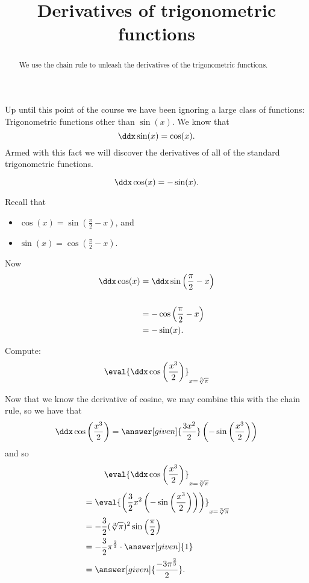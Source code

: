 \documentclass{ximera}
\title[Dig-In:]{Derivatives of trigonometric functions}
\begin{document}
\begin{abstract}
  We use the chain rule to unleash the derivatives of the
  trigonometric functions.
\end{abstract}
\maketitle


Up until this point of the course we have been ignoring a large class
of functions: Trigonometric functions other than $\sin(x)$. We know
that
\[
\ddx \sin(x) = \cos(x).
\]
Armed with this fact we will discover the derivatives of all of the
standard trigonometric functions.



\begin{theorem}
\[
\ddx \cos(x) = -\sin(x).
\]
\begin{explanation}
Recall that
\begin{itemize}
\item $\cos(x) = \sin\left(\frac{\pi}{2}-x\right)$, and
\item $\sin(x) = \cos\left(\frac{\pi}{2}-x\right)$.
\end{itemize}
Now
\begin{align*}
\ddx \cos(x) &= \ddx \sin\left(\frac{\pi}{2}-x\right)\\ \\
&=-\cos\left(\frac{\pi}{2}-x\right) \\
&= -\sin(x).
\end{align*}
\end{explanation}
\end{theorem}

\begin{example}
Compute:
\[
\eval{\ddx \cos \left( \frac{x^3}{2} \right)}_{x=\sqrt[3]{\pi}}
\]
\begin{explanation}
Now that we know the derivative of cosine, we may combine this with the
chain rule, so we have that
\[
\ddx \cos \left( \frac{x^3}{2} \right) = \answer[given]{\frac{3 x^2}{2}} \left(- \sin \left( \frac{x^3}{2} \right) \right)
\]
and so
\[
\eval{\ddx \cos \left( \frac{x^3}{2} \right)}_{x=\sqrt[3]{\pi}}
\]
\begin{align*}
  &= \eval{\left( \frac{3}{2} x^2 \left(- \sin \left( \frac{x^3}{2}
    \right) \right) \right)}_{x=\sqrt[3]{\pi}} \\
  &= - \frac{3}{2}(\sqrt[3]{\pi})^2 \sin \left( \frac{\pi}{2} \right) \\
  &= -\frac{3}{2} \pi^{\frac{2}{3}} \cdot \answer[given]{1} \\
  &=\answer[given]{\frac{-3 \pi^{\frac{2}{3}}}{2}}.
\end{align*}
\end{explanation}
\end{example}
\end{document}
